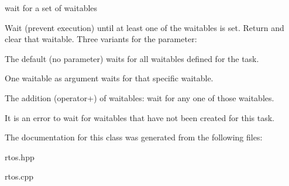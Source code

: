 wait for a set of waitables 

Wait (prevent execution) until at least one of the waitables is set. Return and clear that waitable. Three variants for the parameter\+:


\begin{DoxyItemize}
\item The default (no parameter) waits for all waitables defined for the task.
\item One waitable as argument waits for that specific waitable.
\item The addition (operator+) of waitables\+: wait for any one of those waitables.
\end{DoxyItemize}

It is an error to wait for waitables that have not been created for this task. 

The documentation for this class was generated from the following files\+:\begin{DoxyCompactItemize}
\item 
rtos.\+hpp\item 
rtos.\+cpp\end{DoxyCompactItemize}
